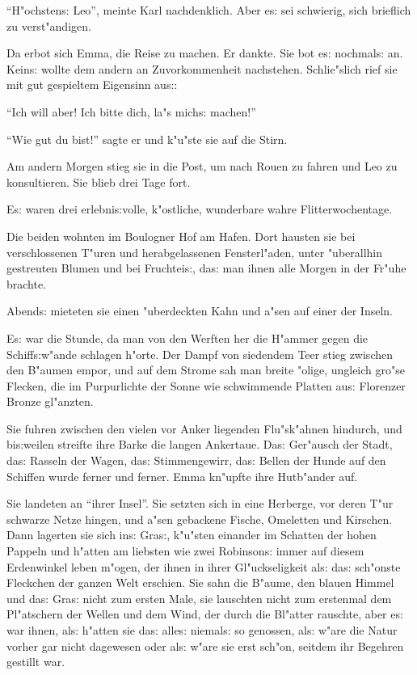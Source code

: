 \documentclass[oneside,12pt]{book}
\newcommand{\s}{s:}%
\begin{document}
"`H"ochsten{\s} Leo"', meinte Karl nachdenklich. Aber e{\s} sei
schwierig, sich brieflich zu verst"andigen.

Da erbot sich Emma, die Reise zu machen. Er dankte. Sie bot e{\s}
nochmal{\s} an. Kein{\s} wollte dem andern an Zuvorkommenheit
nachstehen. Schlie"slich rief sie mit gut gespieltem Eigensinn
au{\s}:

"`Ich will aber! Ich bitte dich, la"s mich{\s} machen!"'

"`Wie gut du bist!"' sagte er und k"u"ste sie auf die Stirn.

Am andern Morgen stieg sie in die Post, um nach Rouen zu fahren
und Leo zu konsultieren. Sie blieb drei Tage fort.


\newpage\begin{center}
{\large \so{Dritte{\s} Kapitel}}\bigskip\bigskip
\end{center}

E{\s} waren drei erlebni{\s}volle, k"ostliche, wunderbare wahre
Flitterwochentage.

Die beiden wohnten im Boulogner Hof am Hafen. Dort hausten sie bei
verschlossenen T"uren und herabgelassenen Fensterl"aden, unter
"uberallhin gestreuten Blumen und bei Fruchtei{\s}, da{\s} man
ihnen alle Morgen in der Fr"uhe brachte.

Abend{\s} mieteten sie einen "uberdeckten Kahn und a"sen auf einer
der Inseln.

E{\s} war die Stunde, da man von den Werften her die H"ammer gegen
die Schiff{\s}w"ande schlagen h"orte. Der Dampf von siedendem Teer
stieg zwischen den B"aumen empor, und auf dem Strome sah man
breite "olige, ungleich gro"se Flecken, die im Purpurlichte der
Sonne wie schwimmende Platten au{\s} Florenzer Bronze gl"anzten.

Sie fuhren zwischen den vielen vor Anker liegenden Flu"sk"ahnen
hindurch, und bi{\s}weilen streifte ihre Barke die langen
Ankertaue. Da{\s} Ger"ausch der Stadt, da{\s} Rasseln der Wagen,
da{\s} Stimmengewirr, da{\s} Bellen der Hunde auf den Schiffen
wurde ferner und ferner. Emma kn"upfte ihre Hutb"ander auf.

Sie landeten an "`ihrer Insel"'. Sie setzten sich in eine
Herberge, vor deren T"ur schwarze Netze hingen, und a"sen
gebackene Fische, Omeletten und Kirschen. Dann lagerten sie sich
in{\s} Gra{\s}, k"u"sten einander im Schatten der hohen Pappeln
und h"atten am liebsten wie zwei Robinson{\s} immer auf diesem
Erdenwinkel leben m"ogen, der ihnen in ihrer Gl"uckseligkeit
al{\s} da{\s} sch"onste Fleckchen der ganzen Welt erschien. Sie
sahn die B"aume, den blauen Himmel und da{\s} Gra{\s} nicht zum
ersten Male, sie lauschten nicht zum erstenmal dem Pl"atschern der
Wellen und dem Wind, der durch die Bl"atter rauschte, aber e{\s}
war ihnen, al{\s} h"atten sie da{\s} alle{\s} niemal{\s} so
genossen, al{\s} w"are die Natur vorher gar nicht dagewesen oder
al{\s} w"are sie erst sch"on, seitdem ihr Begehren gestillt war.
\end{document}
